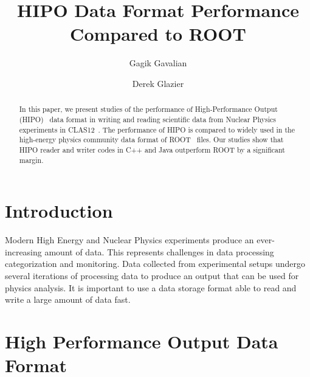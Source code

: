 \documentclass[preprint,12pt]{elsarticle}
\title{HIPO Data Format Performance Compared to ROOT}
\author[1]{Gagik Gavalian}
\author[2]{Derek Glazier}
\begin{document}
\begin{abstract}
  In this paper, we present studies of the performance of High-Performance Output (HIPO)~\cite{HipoLib} data format in
  writing and reading scientific data from Nuclear Physics experiments in CLAS12~\cite{Burkert:2020akg}. The performance of
  HIPO is compared to widely used in the high-energy physics community data format of ROOT~\cite{Brun:1997pa} files.
  Our studies show that HIPO reader and writer codes in C++ and Java outperform ROOT by a significant margin.
\end{abstract}
\maketitle

\section{Introduction}
\indent

Modern High Energy and Nuclear Physics experiments produce an ever-increasing amount of data. This represents 
challenges in data processing categorization and monitoring. Data collected from experimental setups undergo several
iterations of processing data to produce an output that can be used for physics analysis. It is important to use a data storage 
format able to read and write a large amount of data fast. 

\section{High Performance Output Data Format}
\end{document}
